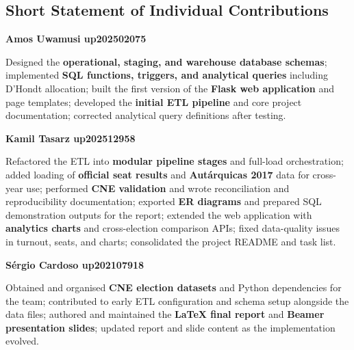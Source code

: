 \subsection{Short Statement of Individual Contributions}

\noindent\textbf{Amos Uwamusi up202502075}

\noindent Designed the \textbf{operational, staging, and warehouse database schemas}; implemented \textbf{SQL functions, triggers, and analytical queries} including D'Hondt allocation; built the first version of the \textbf{Flask web application} and page templates; developed the \textbf{initial ETL pipeline} and core project documentation; corrected analytical query definitions after testing.

\medskip
\noindent\textbf{Kamil Tasarz up202512958}

\noindent Refactored the ETL into \textbf{modular pipeline stages} and full-load orchestration; added loading of \textbf{official seat results} and \textbf{Aut\'{a}rquicas 2017} data for cross-year use; performed \textbf{CNE validation} and wrote reconciliation and reproducibility documentation; exported \textbf{ER diagrams} and prepared SQL demonstration outputs for the report; extended the web application with \textbf{analytics charts} and cross-election comparison APIs; fixed data-quality issues in turnout, seats, and charts; consolidated the project README and task list.

\medskip
\noindent\textbf{S\'{e}rgio Cardoso up202107918}

\noindent Obtained and organised \textbf{CNE election datasets} and Python dependencies for the team; contributed to early ETL configuration and schema setup alongside the data files; authored and maintained the \textbf{LaTeX final report} and \textbf{Beamer presentation slides}; updated report and slide content as the implementation evolved.